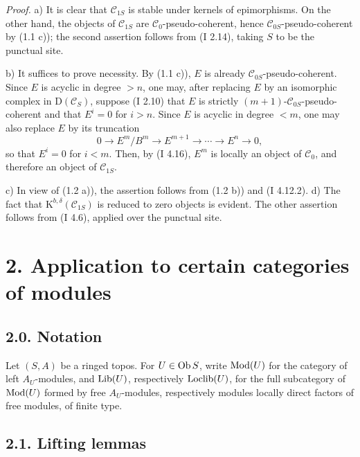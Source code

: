 \documentclass[11pt]{article}
\begin{document}
\emph{Proof.} a) It is clear that $\mathcal C_{1S}$ is stable under kernels of epimorphisms. On the other hand, the objects of $\mathcal C_{1S}$ are $\mathcal C_0$-pseudo-coherent, hence $\mathcal C_{0S}$-pseudo-coherent by (1.1 c)); the second assertion follows from (I 2.14), taking $S$ to be the punctual site.

b) It suffices to prove necessity. By (1.1 c)), $E$ is already $\mathcal C_{0S}$-pseudo-coherent. Since $E$ is acyclic in degree $>n$, one may, after replacing $E$ by an isomorphic complex in $\mathrm D(\mathcal C_S)$, suppose (I 2.10) that $E$ is strictly $(m+1)$-$\mathcal C_{0S}$-pseudo-coherent and that $E^i=0$ for $i>n$. Since $E$ is acyclic in degree $<m$, one may also replace $E$ by its truncation
\[
0\longrightarrow E^m/B^m\longrightarrow E^{m+1}\longrightarrow\cdots\longrightarrow E^n\longrightarrow0,
\]
so that $E^i=0$ for $i<m$. Then, by (I 4.16), $E^m$ is locally an object of $\mathcal C_0$, and therefore an object of $\mathcal C_{1S}$.

c) In view of (1.2 a)), the assertion follows from (1.2 b)) and (I 4.12.2). d) The fact that $\mathrm K^{b,\delta}(\mathcal C_{1S})$ is reduced to zero objects is evident. The other assertion follows from (I 4.6), applied over the punctual site.

\section*{2. Application to certain categories of modules}

\subsection*{2.0. Notation}
Let $(S,A)$ be a ringed topos. For $U\in\operatorname{Ob} S$, write $\operatorname{Mod}(U)$ for the category of left $A_U$-modules, and $\operatorname{Lib}(U)$, respectively $\operatorname{Loclib}(U)$, for the full subcategory of $\operatorname{Mod}(U)$ formed by free $A_U$-modules, respectively modules locally direct factors of free modules, of finite type.

\subsection*{2.1. Lifting lemmas}
\end{document}
